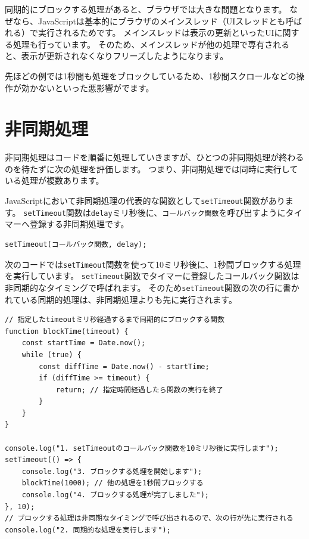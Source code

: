 同期的にブロックする処理があると、ブラウザでは大きな問題となります。
なぜなら、JavaScriptは基本的にブラウザのメインスレッド（UIスレッドとも呼ばれる）で実行されるためです。
メインスレッドは表示の更新といったUIに関する処理も行っています。
そのため、メインスレッドが他の処理で専有されると、表示が更新されなくなりフリーズしたようになります。

先ほどの例では1秒間も処理をブロックしているため、1秒間スクロールなどの操作が効かないといった悪影響がでます。

\hypertarget{async-processing}{%
\section{非同期処理}\label{async-processing}}

非同期処理はコードを順番に処理していきますが、ひとつの非同期処理が終わるのを待たずに次の処理を評価します。
つまり、非同期処理では同時に実行している処理が複数あります。

JavaScriptにおいて非同期処理の代表的な関数として\texttt{setTimeout}関数があります。
\texttt{setTimeout}関数は\texttt{delay}ミリ秒後に、\texttt{コールバック関数}を呼び出すようにタイマーへ登録する非同期処理です。

\begin{lstlisting}
setTimeout(コールバック関数, delay);
\end{lstlisting}

次のコードでは\texttt{setTimeout}関数を使って10ミリ秒後に、1秒間ブロックする処理を実行しています。
\texttt{setTimeout}関数でタイマーに登録したコールバック関数は非同期的なタイミングで呼ばれます。
そのため\texttt{setTimeout}関数の次の行に書かれている同期的処理は、非同期処理よりも先に実行されます。

\begin{lstlisting}
// 指定したtimeoutミリ秒経過するまで同期的にブロックする関数
function blockTime(timeout) { 
    const startTime = Date.now();
    while (true) {
        const diffTime = Date.now() - startTime;
        if (diffTime >= timeout) {
            return; // 指定時間経過したら関数の実行を終了
        }
    }
}

console.log("1. setTimeoutのコールバック関数を10ミリ秒後に実行します");
setTimeout(() => {
    console.log("3. ブロックする処理を開始します");
    blockTime(1000); // 他の処理を1秒間ブロックする
    console.log("4. ブロックする処理が完了しました");
}, 10);
// ブロックする処理は非同期なタイミングで呼び出されるので、次の行が先に実行される
console.log("2. 同期的な処理を実行します");
\end{lstlisting}

